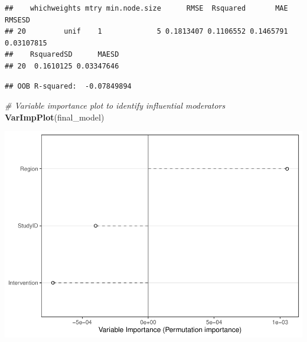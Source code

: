 \documentclass[
]{book}
\newenvironment{Shaded}{\begin{snugshade}}{\end{snugshade}}
\newcommand{\CommentTok}[1]{\textcolor[rgb]{0.56,0.35,0.01}{\textit{#1}}}
\newcommand{\FunctionTok}[1]{\textcolor[rgb]{0.13,0.29,0.53}{\textbf{#1}}}
\newcommand{\NormalTok}[1]{#1}
\newcommand{\OtherTok}[1]{\textcolor[rgb]{0.56,0.35,0.01}{#1}}
\newcommand{\SpecialCharTok}[1]{\textcolor[rgb]{0.81,0.36,0.00}{\textbf{#1}}}
\newcommand{\StringTok}[1]{\textcolor[rgb]{0.31,0.60,0.02}{#1}}
\begin{document}
\begin{verbatim}
##    whichweights mtry min.node.size      RMSE  Rsquared       MAE     RMSESD
## 20         unif    1             5 0.1813407 0.1106552 0.1465791 0.03107815
##    RsquaredSD      MAESD
## 20  0.1610125 0.03347646
\end{verbatim}

\begin{Shaded}
\end{Shaded}

\begin{verbatim}
## OOB R-squared:  -0.07849894
\end{verbatim}

\begin{Shaded}
\begin{Highlighting}[]
\CommentTok{\# Variable importance plot to identify influential moderators}
\FunctionTok{VarImpPlot}\NormalTok{(final\_model)}
\end{Highlighting}
\end{Shaded}

\includegraphics{_main_files/figure-latex/unnamed-chunk-14-2.pdf}
\end{document}
